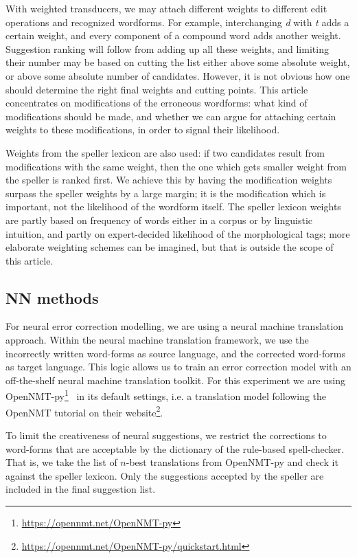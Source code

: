 \documentclass{flammie}
\begin{document}
With weighted transducers, we may attach different weights to different edit
operations and recognized wordforms. For example, interchanging \textit{d} with
\textit{t} adds a certain weight, and every component of a compound word adds
another weight. Suggestion ranking will follow from adding up all these weights,
and limiting their number may be based on cutting the list either above some
absolute weight, or above some absolute number of candidates. However, it is not
obvious how one should determine the right final weights and cutting points.
This article concentrates on modifications of the erroneous wordforms: what kind
of modifications should be made, and whether we can argue for attaching certain
weights to these modifications, in order to signal their likelihood.

Weights from the speller lexicon are also used: if two candidates result from
modifications with the same weight, then the one which gets smaller weight from
the speller is ranked first. We achieve this by having the modification weights
surpass the speller weights by a large margin; it is the modification which is
important, not the likelihood of the wordform itself.  The speller lexicon
weights are partly based on frequency of words either in a corpus or by
linguistic intuition, and partly on expert-decided likelihood of the
morphological tags; more elaborate weighting schemes can be imagined, but that
is outside the scope of this article.


\subsection{NN methods}

For neural error correction modelling, we are using a neural machine translation
approach. Within the neural machine translation framework, we use the
incorrectly written word-forms as source language, and the corrected word-forms
as target language. This logic allows us to train an error correction model with
an off-the-shelf neural machine translation toolkit.  For this experiment we are
using OpenNMT-py\footnote{\url{https://opennmt.net/OpenNMT-py}}~\cite{opennmt}
in its default settings, i.e. a translation model following the OpenNMT tutorial
on their website\footnote{\url{https://opennmt.net/OpenNMT-py/quickstart.html}}.

To limit the creativeness of neural suggestions, we restrict the corrections to
word-forms that are acceptable by the dictionary of the rule-based
spell-checker. That is, we take the list of \(n\)-best translations from
OpenNMT-py and check it against the speller lexicon. Only the suggestions
accepted by the speller are included in the final suggestion list.
\end{document}
